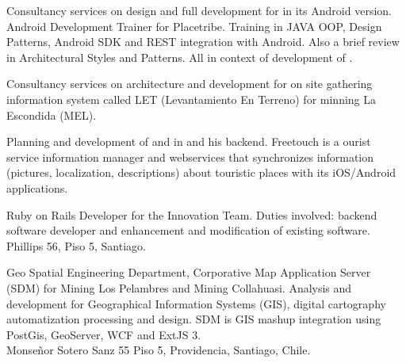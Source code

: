 \documentclass[11pt,letterpaper,roman]{moderncv}
\begin{document}
	 {\scd} {\paonde} {\stgo} {}
	{Consultancy services on design and full development for \paondeapp 
	in its Android version.
	}
	 {\tchr} {\placetribe} {\stgo} {}
	{Android Development Trainer for Placetribe. Training in JAVA
	OOP, Design Patterns, Android SDK and REST integration with Android. Also a
	brief review in Architectural Styles and Patterns. All in context of development
	of \placetribeapp.
	}



	 {\scd} {\jobbitgames} {\stgo} {}
	{Consultancy services on architecture and development for on site
	gathering information system called LET (Levantamiento En Terreno) for minning
	La Escondida (MEL).
	}

	 {\scd} {\mataveri} {\stgo} {}
	{Planning and development of \freetouchchile and \freetouchperu in
	\android and his backend.  Freetouch is a ourist service information manager and
	webservices that synchronizes information (pictures, localization, descriptions)
	about touristic places with its iOS/Android applications.
	}
	
	 {\se} {\multicaja} {\stgo} {}
	{Ruby on Rails Developer for the Innovation Team. Duties involved:
	backend software developer and enhancement and modification of existing
	software. \\
	Phillips 56, Piso 5, Santiago.
	}

	 {\se} {\ikom} {\stgo} {} {Geo Spatial Engineering
	Department, Corporative Map Application Server (SDM) for Mining Los Pelambres
	and Mining Collahuasi.  Analysis and development for Geographical Information
	Systems (GIS), digital cartography automatization processing and design.  SDM is
	GIS mashup integration using PostGis, GeoServer, WCF and ExtJS 3. 
	\\ Monse\~nor
	Sotero Sanz 55 Piso 5, Providencia, Santiago, Chile.}
\end{document}
